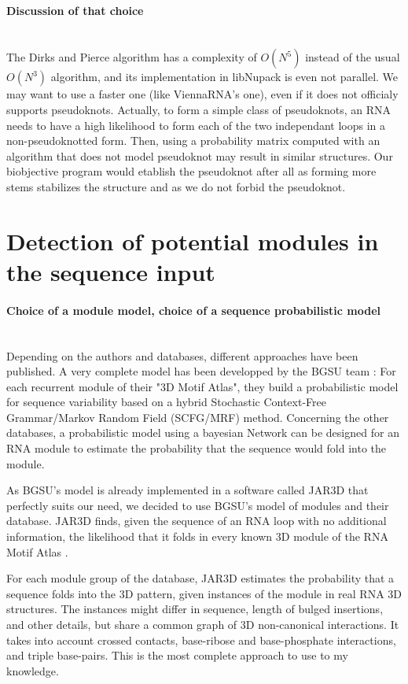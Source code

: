 \documentclass{article}
\begin{document}
\paragraph{Discussion of that choice} ~ \\
The Dirks and Pierce algorithm has a complexity of \(O(N^5)\) instead of the usual \(O(N^3)\) algorithm, and its implementation in libNupack is even not parallel.
We may want to use a faster one (like ViennaRNA's one), even if it does not officialy supports pseudoknots.
Actually, to form a simple class of pseudoknots, an RNA needs to have a high likelihood to form each of the two independant loops in a non-pseudoknotted form. 
Then, using a probability matrix computed with an algorithm that does not model pseudoknot may result in similar structures. 
Our biobjective program would etablish the pseudoknot after all as forming more stems stabilizes the structure and as we do not forbid the pseudoknot.

\section{Detection of potential modules in the sequence input}
\paragraph{\textbf{Choice of a module model, choice of a sequence probabilistic model}} ~ \\
Depending on the authors and databases, different approaches have been published. 
A very complete model has been developped by the BGSU team \cite{zirbel_identifying_2015} : For each recurrent module of their "3D Motif Atlas", they build a probabilistic model for sequence variability based on a hybrid Stochastic Context-Free Grammar/Markov Random Field (SCFG/MRF) method.
Concerning the other databases, a probabilistic model using a bayesian Network can be designed for an RNA module \cite{cruz2011sequence} to estimate the probability that the sequence would fold into the module. 

As BGSU's model is already implemented in a software called JAR3D that perfectly suits our need, we decided to use BGSU's model of modules and their database.
JAR3D finds, given the sequence of an RNA loop with no additional information, the likelihood that it folds in every known 3D module of the RNA Motif Atlas \cite{petrov_automated_2013}.

For each module group of the database, JAR3D estimates the probability that a sequence folds into the 3D pattern, given instances of the module in real RNA 3D structures. 
The instances might differ in sequence, length of bulged insertions, and other details, but share a common graph of 3D non-canonical interactions.
It takes into account crossed contacts, base-ribose and base-phosphate interactions, and triple base-pairs.
This is the most complete approach to use to my knowledge.
\end{document}
